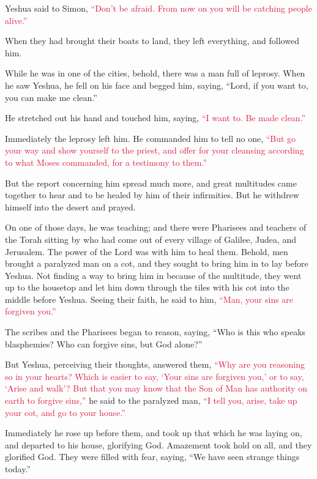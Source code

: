 Yeshua said to Simon,
\textcolor{crimson}{“Don’t be afraid. From now on you will be catching people alive.”}

\myverse{}When they had brought their boats to land, they left everything,
and followed him.

\myverse{}While he was in one of the cities, behold, there was a man full
of leprosy. When he saw Yeshua, he fell on his face and begged him, saying, “Lord, if you want to, you
can make me clean.”

\myverse{}He stretched out his hand and touched him, saying,
\textcolor{crimson}{“I want to. Be made clean.”}

Immediately the leprosy left him.
\myverse{}He commanded him to tell no one,
\textcolor{crimson}{“But go your way and show yourself to the priest, and offer for your cleansing according to what Moses
	commanded, for a testimony to them.”}

\myverse{}But the report concerning him spread much more, and great multitudes
came together to hear and to be healed by him of their infirmities.
\myverse{}But he withdrew himself into the desert and prayed.

\myverse{}On one of those days, he was teaching; and there were Pharisees
and teachers of the Torah sitting by who had come out of every village of Galilee, Judea, and Jerusalem.
The power of the Lord was with him to heal them.
\myverse{}Behold, men brought a paralyzed man on a cot, and they sought to bring him
in to lay before Yeshua.
\myverse{}Not finding a way to bring him in because of the multitude, they went up to
the housetop and let him down through the tiles with his cot into the middle before Yeshua.
\myverse{}Seeing their faith, he said to him,
\textcolor{crimson}{“Man, your sins are forgiven you.”}

\myverse{}The scribes and the Pharisees began to reason, saying, “Who is
this who speaks blasphemies? Who can forgive sins, but God alone?”

\myverse{}But Yeshua, perceiving their thoughts, answered them,
\textcolor{crimson}{“Why are you reasoning so in your hearts?
}
\myverse{}\textcolor{crimson}{Which is easier to say, ‘Your sins are forgiven you,’ or to say, ‘Arise
	and walk’?
}
\myverse{}\textcolor{crimson}{But that you may know that the Son of Man has authority on earth to forgive
	sins,”} he said to the paralyzed man,
\textcolor{crimson}{“I tell you, arise, take up your cot, and go to your house.”}

\myverse{}Immediately he rose up before them, and took up that which he
was laying on, and departed to his house, glorifying God.
\myverse{}Amazement took hold on all, and they glorified God. They were filled with
fear, saying, “We have seen strange things today.”


